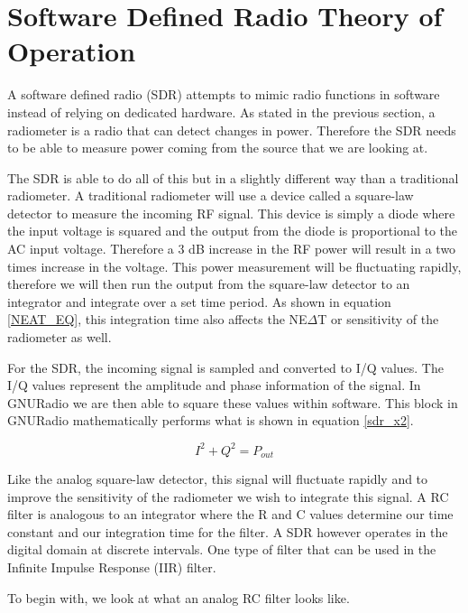 \section{Software Defined Radio Theory of Operation}

A software defined radio (SDR) attempts to mimic radio functions in software instead of relying on dedicated hardware.  As stated in the previous section, a radiometer is a radio that can detect changes in power.  Therefore the SDR needs to be able to measure power coming from the source that we are looking at.  

The SDR is able to do all of this but in a slightly different way than a traditional radiometer.  A traditional radiometer will use a device called a square-law detector to measure the incoming RF signal.  This device is simply a diode where the input voltage is squared and the output from the diode is proportional to the AC input voltage.  Therefore a 3 dB increase in the RF power will result in a two times increase in the voltage.  This power measurement will be fluctuating rapidly, therefore we will then run the output from the square-law detector to an integrator and integrate over a set time period.  As shown in equation \ref{NEAT_EQ}, this integration time also affects the NE$\Delta$T or sensitivity of the radiometer as well.

For the SDR, the incoming signal is sampled and converted to I/Q values.  The I/Q values represent the amplitude and phase information of the signal.  In GNURadio we are then able to square these values within software.  This block in GNURadio mathematically performs what is shown in equation \ref{sdr_x2}.

\begin{equation}\label{sdr_x2}
I^2+Q^2 = P_{out}
\end{equation}

Like the analog square-law detector, this signal will fluctuate rapidly and to improve the sensitivity of the radiometer we wish to integrate this signal.  A RC filter is analogous to an integrator where the R and C values determine our time constant and our integration time for the filter.  A SDR however operates in the digital domain at discrete intervals.  One type of filter that can be used in the Infinite Impulse Response (IIR) filter. 

To begin with, we look at what an analog RC filter looks like. 

